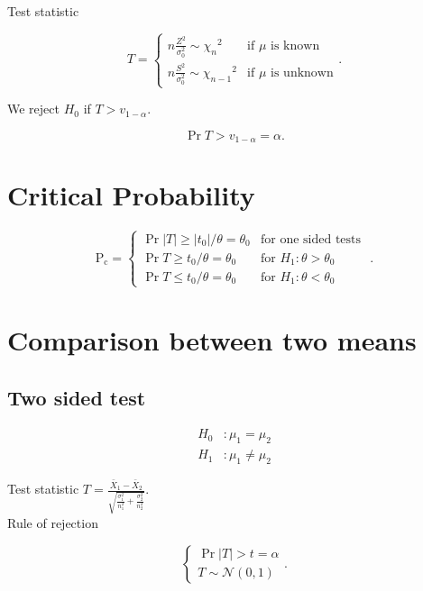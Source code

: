 \documentclass{report}
\begin{document}
Test statistic

\[
	T = \begin{cases}
		n\frac{Z^2}{\sigma_0^2} \sim {\chi_{n}}^2   & \text{if } \mu \text{ is known}   \\
		n\frac{S^2}{\sigma_0^2} \sim {\chi_{n-1}}^2 & \text{if } \mu \text{ is unknown}
	\end{cases}
	.\]

We reject $H_0$ if $T > v_{1-\alpha}$.

\[
	\Pr{T > v_{1-\alpha}} = \alpha
	.\]

\section{Critical Probability}

\[
	\mathrm{P}_\text{c} = \begin{cases}
		\Pr{|T|\geq|t_0|/\theta=\theta_0} & \text{for one sided tests }        \\
		\Pr{T\geq t_0/\theta=\theta_0}    & \text{for } H_1: \theta > \theta_0 \\
		\Pr{T\leq t_0/\theta=\theta_0}    & \text{for } H_1: \theta < \theta_0
	\end{cases}
	.\]


\section{Comparison between two means}

\subsection{Two sided test}

\begin{align*}
	H_0 & : \mu_1 = \mu_2    \\
	H_1 & : \mu_1 \neq \mu_2
\end{align*}

Test statistic $T = \frac{\bar{X}_1 - \bar{X}_2}{\sqrt{\frac{\sigma_1^2}{n_1^2} + \frac{\sigma_2^2}{n_2^2}}}$.\\

Rule of rejection

\[
	\begin{cases}
		\Pr{|T|>t} = \alpha \\
		T\sim \mathcal{N}(0,1)
	\end{cases}
	.\]

\end{document}
